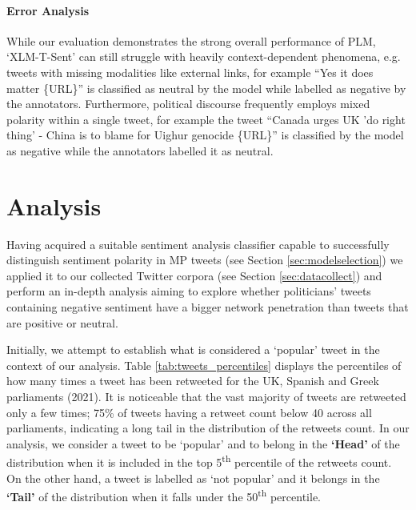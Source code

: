 \paragraph{Error Analysis} While our evaluation demonstrates the strong overall performance of \ac{PLM}, `XLM-T-Sent' can still struggle with heavily context-dependent phenomena, e.g. tweets with missing modalities like external links, for example ``Yes it does matter {\{URL\}}'' is classified as neutral by the model while labelled as negative by the annotators. Furthermore, political discourse frequently employs mixed polarity within a single tweet, for example  the tweet ``Canada urges UK 'do right thing' - China is to blame for Uighur genocide {\{URL\}}'' is classified by the model as negative while the annotators labelled it as neutral.

\section{Analysis}\label{sec:analysis}

Having acquired a suitable sentiment analysis classifier capable to successfully distinguish sentiment polarity in \ac{MP} tweets (see Section \ref{sec:modelselection}) we applied it to our collected Twitter corpora (see Section \ref{sec:datacollect}) and perform an in-depth analysis aiming to explore whether politicians' tweets containing negative sentiment have a bigger network penetration than tweets that are positive or neutral.

Initially, we attempt to establish what is considered a `popular' tweet in the context of our analysis. Table \ref{tab:tweets_percentiles} displays the percentiles of how many times a tweet has been retweeted for the UK, Spanish and Greek parliaments (2021). It is noticeable that the vast majority of tweets are retweeted only a few times; 75\% of tweets having a retweet count below 40 across all parliaments, indicating a long tail in the distribution of the retweets count. In our analysis, we consider a tweet to be `popular' and to belong in the \textbf{`Head'} of the distribution when it is included in the top 5\textsuperscript{th} percentile of the retweets count. On the other hand, a tweet is labelled as `not popular' and it belongs in the \textbf{`Tail'} of the distribution when it falls under the 50\textsuperscript{th} percentile.


